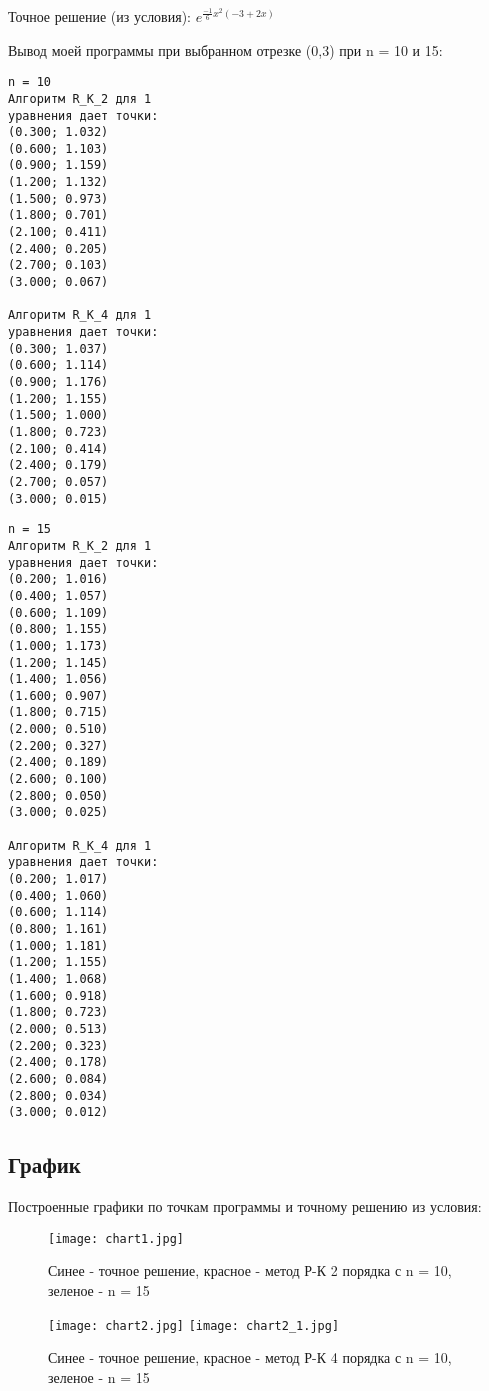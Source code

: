 \documentclass[a4paper,12pt,titlepage,finall]{article}
\begin{document}
Точное решение (из условия): $e^{\frac{-1}{6} x^{2} (-3+2x)}$

Вывод моей программы при выбранном отрезке (0,3) при n = 10 и 15:


\begin{multicols}{2}

\begin{verbatim}
n = 10
Алгоритм R_K_2 для 1 
уравнения дает точки:
(0.300; 1.032)
(0.600; 1.103)
(0.900; 1.159)
(1.200; 1.132)
(1.500; 0.973)
(1.800; 0.701)
(2.100; 0.411)
(2.400; 0.205)
(2.700; 0.103)
(3.000; 0.067)

Алгоритм R_K_4 для 1 
уравнения дает точки:
(0.300; 1.037)
(0.600; 1.114)
(0.900; 1.176)
(1.200; 1.155)
(1.500; 1.000)
(1.800; 0.723)
(2.100; 0.414)
(2.400; 0.179)
(2.700; 0.057)
(3.000; 0.015)
\end{verbatim}

\columnbreak
\begin{verbatim}
n = 15
Алгоритм R_K_2 для 1 
уравнения дает точки:
(0.200; 1.016)
(0.400; 1.057)
(0.600; 1.109)
(0.800; 1.155)
(1.000; 1.173)
(1.200; 1.145)
(1.400; 1.056)
(1.600; 0.907)
(1.800; 0.715)
(2.000; 0.510)
(2.200; 0.327)
(2.400; 0.189)
(2.600; 0.100)
(2.800; 0.050)
(3.000; 0.025)

Алгоритм R_K_4 для 1 
уравнения дает точки:
(0.200; 1.017)
(0.400; 1.060)
(0.600; 1.114)
(0.800; 1.161)
(1.000; 1.181)
(1.200; 1.155)
(1.400; 1.068)
(1.600; 0.918)
(1.800; 0.723)
(2.000; 0.513)
(2.200; 0.323)
(2.400; 0.178)
(2.600; 0.084)
(2.800; 0.034)
(3.000; 0.012)
\end{verbatim}

\end{multicols}

\newpage

\subsection{График}
Построенные графики по точкам программы и точному решению из условия:



\begin{figure}[h!]
\centering
\texttt{[image: chart1.jpg]}
\caption{Синее - точное решение, красное - метод Р-К 2 порядка с n = 10, зеленое - n = 15}
\end{figure}




\begin{figure}[h!]
\centering
\texttt{[image: chart2.jpg]}
\texttt{[image: chart2\_1.jpg]}
\caption{Синее - точное решение, красное - метод Р-К 4 порядка с n = 10, зеленое - n = 15}
\end{figure}
\end{document}
